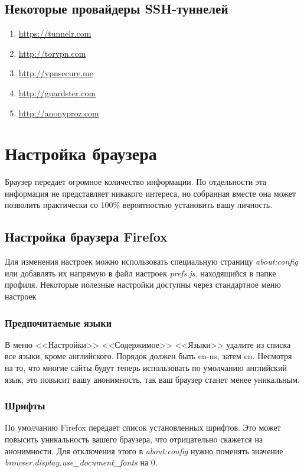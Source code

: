 \subsection{Некоторые провайдеры SSH-туннелей}
\begin{enumerate}
\item \url{https://tunnelr.com}
\item \url{http://torvpn.com}
\item \url{http://vpnsecure.me}
\item \url{http://guardster.com}
\item \url{http://anonyproz.com}
\end{enumerate}

\section{Настройка браузера}
\begin{important}
Браузер передает огромное количество информации. По отдельности эта информация не представляет никакого интереса, но собранная вместе она может позволить практически со 100\% вероятностью установить вашу личность.
\end{important}
\subsection{Настройка браузера Firefox}
Для изменения настроек можно использовать специальную страницу \textit{about:config} или добавлять их напрямую в файл настроек \textit{prefs.js}, находящийся в папке профиля. Некоторые полезные настройки доступны через стандартное меню настроек
\subsubsection{Предпочитаемые языки}
В меню <<Настройки>> \textrightarrow <<Содержимое>> \textrightarrow <<Языки>> удалите из списка все языки, кроме английского. Порядок должен быть en-us, затем en. Несмотря на то, что многие сайты будут теперь использовать по умолчанию английский язык, это повысит вашу анонимность, так ваш браузер станет менее уникальным.
\subsubsection{Шрифты}
По умолчанию Firefox передает список установленных шрифтов. Это может повысить уникальность вашего браузера, что отрицательно скажется на анонимности. Для отключения этого в \textit{about:config} нужно поменять значение \textit{browser.display.use\_document\_fonts} на 0.
